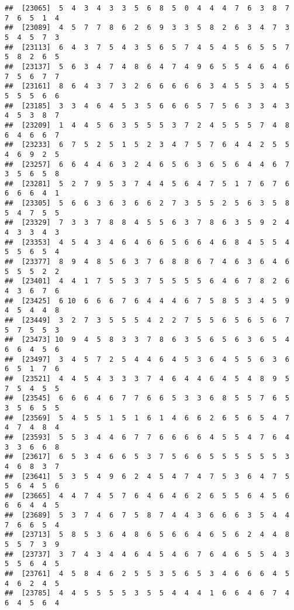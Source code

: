 \documentclass[
]{book}
\begin{document}
\begin{verbatim}
##  [23065]  5  4  3  4  3  3  5  6  8  5  0  4  4  4  7  6  3  8  7  7  6  5  1  4
##  [23089]  4  5  7  7  8  6  2  6  9  3  3  5  8  2  6  3  4  7  3  5  4  5  7  3
##  [23113]  6  4  3  7  5  4  3  5  6  5  7  4  5  4  5  6  5  5  7  5  8  2  6  5
##  [23137]  5  6  3  4  7  4  8  6  4  7  4  9  6  5  5  4  6  4  6  7  5  6  7  7
##  [23161]  8  6  4  3  7  3  2  6  6  6  6  6  3  4  5  5  3  4  5  5  5  5  6  6
##  [23185]  3  3  4  6  4  5  3  5  6  6  6  5  7  5  6  3  3  4  3  4  5  3  8  7
##  [23209]  1  4  4  5  6  3  5  5  5  3  7  2  4  5  5  5  7  4  8  6  4  6  6  7
##  [23233]  6  7  5  2  5  1  5  2  3  4  7  5  7  6  4  4  2  5  5  4  6  9  2  5
##  [23257]  6  6  4  4  6  3  2  4  6  5  6  3  6  5  6  4  4  6  7  3  5  6  5  8
##  [23281]  5  2  7  9  5  3  7  4  4  5  6  4  7  5  1  7  6  7  6  6  6  6  4  1
##  [23305]  5  6  6  3  6  3  6  6  2  7  3  5  5  2  5  6  3  5  8  5  4  7  5  5
##  [23329]  7  3  3  7  8  8  4  5  5  6  3  7  8  6  3  5  9  2  4  4  3  3  4  3
##  [23353]  4  5  4  3  4  6  4  6  6  5  6  6  4  6  8  4  5  5  4  5  5  6  5  4
##  [23377]  8  9  4  8  5  6  3  7  6  8  8  6  7  4  6  3  6  4  6  5  5  5  2  2
##  [23401]  4  4  1  7  5  5  3  7  5  5  5  5  6  4  6  7  8  2  6  4  3  6  7  6
##  [23425]  6 10  6  6  6  7  6  4  4  4  6  7  5  8  5  3  4  5  9  4  5  4  4  8
##  [23449]  3  2  7  3  5  5  5  4  2  2  7  5  5  6  5  6  5  6  7  5  7  5  5  3
##  [23473] 10  9  4  5  8  3  3  7  8  6  3  5  6  5  6  3  6  5  4  6  6  4  5  6
##  [23497]  3  4  5  7  2  5  4  4  6  4  5  3  6  4  5  5  6  3  6  6  5  1  7  6
##  [23521]  4  4  5  4  3  3  3  7  4  6  4  4  6  4  5  4  8  9  5  7  5  4  5  5
##  [23545]  6  6  6  4  6  7  7  6  6  5  3  3  6  8  5  5  7  6  5  3  5  6  5  5
##  [23569]  5  4  5  5  1  5  1  6  1  4  6  6  2  6  5  6  5  4  7  4  7  4  8  4
##  [23593]  5  5  3  4  4  6  7  7  6  6  6  6  4  5  5  4  7  6  4  3  3  6  6  8
##  [23617]  6  5  3  4  6  6  5  3  7  5  6  6  5  5  5  5  5  5  3  4  6  8  3  7
##  [23641]  5  3  5  4  9  6  2  4  5  4  7  4  7  5  3  6  4  7  5  5  6  4  5  6
##  [23665]  4  4  7  4  5  7  6  4  6  4  6  2  6  5  5  6  4  5  6  6  6  4  4  5
##  [23689]  5  3  7  4  6  7  5  8  7  4  4  3  6  6  6  3  5  4  4  7  6  6  5  4
##  [23713]  5  8  5  3  6  4  8  6  5  6  6  4  6  5  6  2  4  4  8  5  5  7  3  9
##  [23737]  3  7  4  3  4  4  6  4  5  4  6  7  6  4  6  5  5  4  3  5  5  6  4  5
##  [23761]  4  5  8  4  6  2  5  5  3  5  6  5  3  4  6  6  6  4  5  4  6  2  4  5
##  [23785]  4  4  5  5  5  5  3  5  5  4  4  4  1  6  6  4  6  7  4  6  4  5  6  4

\end{verbatim}
\end{document}
